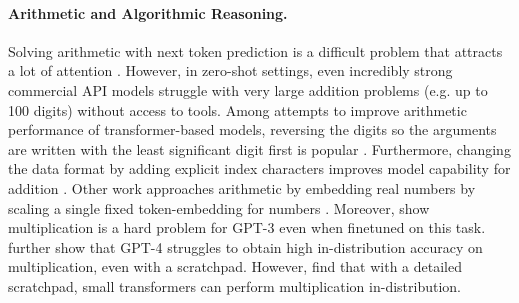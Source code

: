 \documentclass{article}
\begin{document}
\paragraph{Arithmetic and Algorithmic Reasoning.}
Solving arithmetic with next token prediction is a difficult problem that attracts a lot of attention \citep[e.g.][]{saxton2019analysing}. 
However, in zero-shot settings, even incredibly strong commercial API models struggle with very large addition problems (e.g. up to 100 digits) without access to tools. 
Among attempts to improve arithmetic performance of transformer-based models, reversing the digits so the arguments are written with the least significant digit first is popular \citep{lee2023teaching, shen2023positional, zhou2023algorithms, zhou2024transformers}.
Furthermore, changing the data format by adding explicit index characters improves model capability for addition \citep{zhou2023algorithms, zhou2024transformers, olsson2022context}. 
Other work approaches arithmetic by embedding real numbers by scaling a single fixed token-embedding for numbers \citep{golkar2023xval}.
Moreover, \citet{dziri2023faith} show multiplication is a hard problem for GPT-3 \citep{brown2020language} even when finetuned on this task.
\citet{dziri2023faith} further show that GPT-4 \citep{openai2023gpt4tr} struggles to obtain high in-distribution accuracy on multiplication, even with a scratchpad. 
However, \citet{lee2023teaching} find that with a detailed scratchpad, small transformers can perform multiplication in-distribution. 
\end{document}
